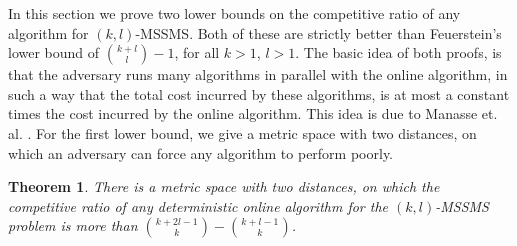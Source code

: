 \documentclass[11pt]{article}
\theoremstyle{plain}\newtheorem{theorem}{Theorem}
\theoremstyle{definition}
\theoremstyle{remark}
\begin{document}
In this section we prove two lower bounds on the competitive ratio of any algorithm for $(k,l)$-MSSMS. Both of these are strictly better than Feuerstein's lower bound \cite{Feuerstein98} of ${{k+l}\choose{l}}-1$, for all $k>1$, $l>1$. The basic idea of both proofs, is that the adversary runs many algorithms in parallel with the online algorithm, in such a way that the total cost incurred by these algorithms, is at most a constant times the cost incurred by the online algorithm. This idea is due to Manasse et. al. \cite{ManasseMS88}. For the first lower bound, we give a metric space with two distances, on which an adversary can force any algorithm to perform poorly.

\begin{theorem}\label{thm_lower_bound_online}
There is a metric space with two distances, on which the competitive ratio of any deterministic online algorithm for the $(k,l)$-MSSMS problem is more than ${{k+2l-1}\choose{k}}-{{k+l-1}\choose{k}}$.
\end{theorem}
\end{document}
